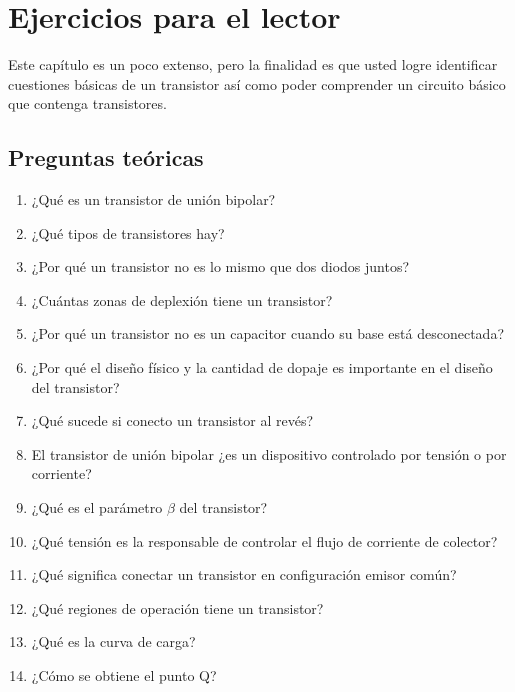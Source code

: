 \section{Ejercicios para el lector}

Este capítulo es un poco extenso, pero la finalidad es que usted logre identificar cuestiones básicas de un transistor así como poder comprender un circuito básico que contenga transistores.

\subsection{Preguntas teóricas}

\begin{enumerate}
  \item ¿Qué es un transistor de unión bipolar?
  \item ¿Qué tipos de transistores hay?
  \item ¿Por qué un transistor no es lo mismo que dos diodos juntos?
  \item ¿Cuántas zonas de deplexión tiene un transistor?
  \item ¿Por qué un transistor no es un capacitor cuando su base está desconectada?
  \item ¿Por qué el diseño físico y la cantidad de dopaje es importante en el diseño del transistor?
  \item ¿Qué sucede si conecto un transistor al revés?
  \item El transistor de unión bipolar ¿es un dispositivo controlado por tensión o por corriente?
  \item ¿Qué es el parámetro \(\beta\) del transistor?
  \item ¿Qué tensión es la responsable de controlar el flujo de corriente de colector?
  \item ¿Qué significa conectar un transistor en configuración emisor común?
  \item ¿Qué regiones de operación tiene un transistor?
  \item ¿Qué es la curva de carga?
  \item ¿Cómo se obtiene el punto Q?
\end{enumerate}

